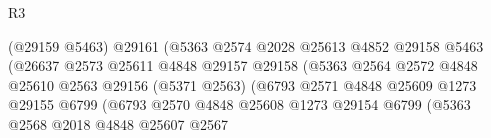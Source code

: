 \begin{lexlean}{R3}
\begin{coremodule}
                                                (@29159 @5463)
                                                @29161
                                                (@5363
                                                  @2574
                                                  @2028
                                                  @25613
                                                  @4852
                                                  @29158
                                                  @5463
                                                  (@26637
                                                    @2573
                                                    @25611
                                                    @4848
                                                    @29157
                                                    @29158
                                                    (@5363
                                                      @2564
                                                      @2572
                                                      @4848
                                                      @25610
                                                      @2563
                                                      @29156
                                                      (@5371 @2563)
                                                      (@6793
                                                        @2571
                                                        @4848
                                                        @25609
                                                        @1273
                                                        @29155
                                                        @6799
                                                        (@6793
                                                          @2570
                                                          @4848
                                                          @25608
                                                          @1273
                                                          @29154
                                                          @6799
                                                          (@5363
                                                            @2568
                                                            @2018
                                                            @4848
                                                            @25607
                                                            @2567

\end{coremodule}
\end{lexlean}

